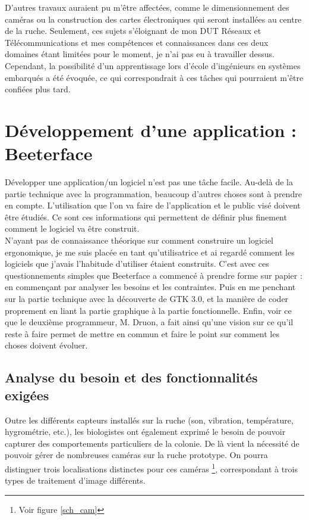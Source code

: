 \documentclass[11pt,french,a4paper]{report}
\begin{document}
D'autres travaux auraient pu m'être affectées, comme le dimensionnement des caméras ou la construction des cartes électroniques
qui seront installées au centre de la ruche. Seulement, ces sujets s'éloignant de mon DUT Réseaux et Télécommunications et mes 
compétences et connaissances dans ces deux domaines étant limitées pour le moment, je n'ai pas eu à travailler dessus.\\
Cependant, la possibilité d'un apprentissage lors d'école d'ingénieurs en systèmes embarqués a été évoquée, ce qui correspondrait 
à ces tâches qui pourraient m'être confiées plus tard.


\chapter{Développement d'une application : Beeterface}
Développer une application/un logiciel n'est pas une tâche facile. Au-delà de la partie technique avec la programmation, 
beaucoup d'autres choses sont à prendre en compte. L'utilisation que l'on va faire de l'application et le public visé 
doivent être étudiés. Ce sont ces informations qui permettent de définir plus finement comment le logiciel va être 
construit. \\
N'ayant pas de connaissance théorique sur comment construire un logiciel ergonomique, je me suis placée en tant qu'utilisatrice
et ai regardé comment les logiciels que j'avais l'habitude d'utiliser étaient construits.
C'est avec ces questionnements simples que Beeterface a commencé à prendre forme sur papier : en commençant par analyser les besoins et 
les contraintes. Puis en me penchant sur la partie technique avec la découverte de GTK 3.0, et la manière de coder proprement en liant
la partie graphique à la partie fonctionnelle. Enfin, voir ce que le deuxième programmeur, M. Druon, a fait ainsi qu'une vision sur ce qu'il reste 
à faire permet de mettre en commun et faire le point sur comment les choses doivent évoluer.
 
 \section{Analyse du besoin et des fonctionnalités exigées}
Outre les différents capteurs installés sur la ruche (son, vibration, température, hygrométrie, etc.), 
les biologistes ont également exprimé le besoin de pouvoir capturer des comportements particuliers de la colonie. 
De là vient la nécessité de pouvoir gérer de nombreuses caméras sur la ruche prototype. 
On pourra distinguer trois localisations distinctes pour ces caméras \footnote{ Voir figure \ref{sch_cam} }, 
correspondant à trois types de traitement d'image différents. \\
\end{document}
